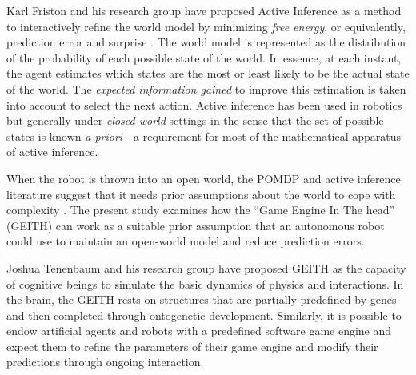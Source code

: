 \documentclass[runningheads]{llncs}
\begin{document}
Karl Friston and his research group have proposed Active Inference \cite[e.g.]{smith_step-by-step_2022} as a method to interactively refine the world model by minimizing \textit{free energy}, or equivalently, prediction error and surprise \cite{friston_free-energy_2010}.
The world model is represented as the distribution of the probability of each possible state of the world. 
In essence, at each instant, the agent estimates which states are the most or least likely to be the actual state of the world.
The \textit{expected information gained} to improve this estimation is taken into account to select the next action.
Active inference has been used in robotics \cite{lanillos_active_2021} but generally under \textit{closed-world} settings in the sense that the set of possible states is known \textit{a priori}---a requirement for most of the mathematical apparatus of active inference. 

When the robot is thrown into an open world, 
the POMDP and active inference literature suggest that it needs prior assumptions about the world to cope with complexity \cite{georgeon_artificial_2024}. 
The present study examines how the ``Game Engine In The head'' (GEITH) can work as a suitable prior assumption that an autonomous robot could use to maintain an open-world model and reduce prediction errors. 

Joshua Tenenbaum and his research group have proposed GEITH \cite{battaglia_simulation_2013} as the capacity of cognitive beings to simulate the basic dynamics of physics and interactions. 
In the brain, the GEITH rests on structures that are partially predefined by genes and then completed through ontogenetic development.  
Similarly, it is possible to endow artificial agents and robots with a predefined software game engine and expect them to refine the parameters of their game engine and modify their predictions through ongoing interaction.
\end{document}
